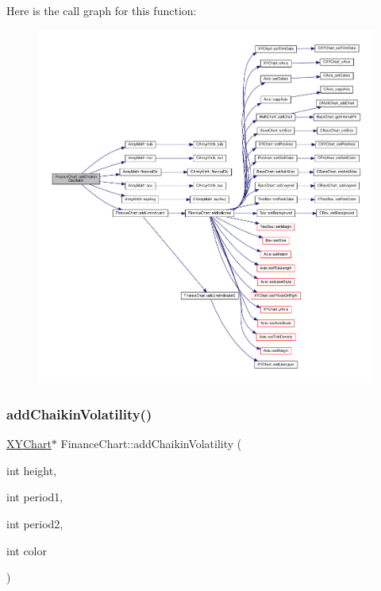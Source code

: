 Here is the call graph for this function\+:
\nopagebreak
\begin{figure}[H]
\begin{center}
\leavevmode
\includegraphics[width=350pt]{class_finance_chart_a413f41ac0d18c63ab6f3d4c4ba4baa6c_cgraph}
\end{center}
\end{figure}
\mbox{\label{class_finance_chart_a45b334a8ddef874d6e152e347a9e725e}} 
\subsubsection{\texorpdfstring{add\+Chaikin\+Volatility()}{addChaikinVolatility()}}
{\footnotesize\ttfamily \hyperlink{class_x_y_chart}{X\+Y\+Chart}$\ast$ Finance\+Chart\+::add\+Chaikin\+Volatility (\begin{DoxyParamCaption}\item[{int}]{height,  }\item[{int}]{period1,  }\item[{int}]{period2,  }\item[{int}]{color }\end{DoxyParamCaption})\hspace{0.3cm}{\ttfamily [inline]}}



